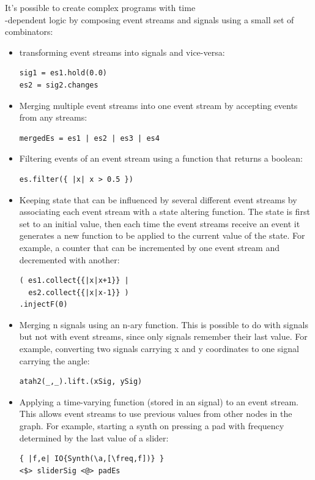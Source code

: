 \documentclass{article}
\begin{document}
It's possible to create complex programs with time\\-dependent logic by composing  event streams and signals using a small set of combinators:

\begin{itemize}

\item transforming event streams into signals and vice-versa:
\begin{Verbatim}
sig1 = es1.hold(0.0)
es2 = sig2.changes
\end{Verbatim}
\item Merging multiple event streams into one event stream by accepting events from any streams:
\begin{Verbatim}
mergedEs = es1 | es2 | es3 | es4
\end{Verbatim}
\item Filtering events of an event stream using a function that returns a boolean:
\begin{Verbatim}
es.filter({ |x| x > 0.5 })
\end{Verbatim}
\item Keeping state that can be influenced by several different event streams by  associating each event stream with a state altering function. The state is first set to an initial value, then each time the event streams receive an event it generates a new function to be applied to the current value of the state. For example, a counter that can be incremented by one event stream and decremented with another:
\begin{Verbatim}
( es1.collect{{|x|x+1}} | 
  es2.collect{{|x|x-1}} )
.injectF(0) 
\end{Verbatim}
\item Merging n signals using an n-ary function. This is possible to do with signals but not with event streams, since only signals remember their last value. For example, converting two signals carrying x and y coordinates to one signal carrying the angle: 
\begin{Verbatim}
atah2(_,_).lift.(xSig, ySig)
\end{Verbatim}
\item Applying a time-varying function (stored in an signal) to an event stream. This allows event streams to use previous values from other nodes in the graph. For example, starting a synth on pressing a pad with frequency determined by the last value of a slider:
\begin{Verbatim}
{ |f,e| IO{Synth(\a,[\freq,f])} }
<$> sliderSig <@> padEs 

\end{Verbatim}
\end{itemize}
\end{document}
